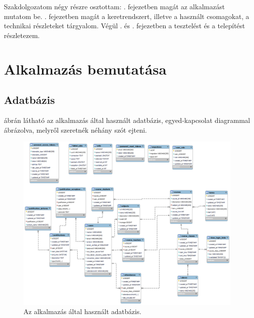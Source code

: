 \documentclass[
]{thesis-ekf}
\theoremstyle{definition}
\theoremstyle{remark}
\begin{document}
Szakdolgozatom négy részre osztottam: . fejezetben magát az alkalmazást mutatom be. . fejezetben magát a keretrendszert, illetve a használt csomagokat, a technikai részleteket tárgyalom. Végül . és . fejezetben a tesztelést és a telepítést részletezem.

\chapter{Alkalmazás bemutatása}
\label{appDescription}
\section{Adatbázis}

 ábrán látható az alkalmazás által használt adatbázis, egyed-kapcsolat diagrammal ábrázolva, melyről szeretnék néhány szót ejteni.

\begin{figure}[ht!]
	\centering
	\includegraphics[width=15cm]{../pictures/db.png}
	\caption{Az alkalmazás által használt adatbázis.}
	\label{database}
\end{figure}
\end{document}
